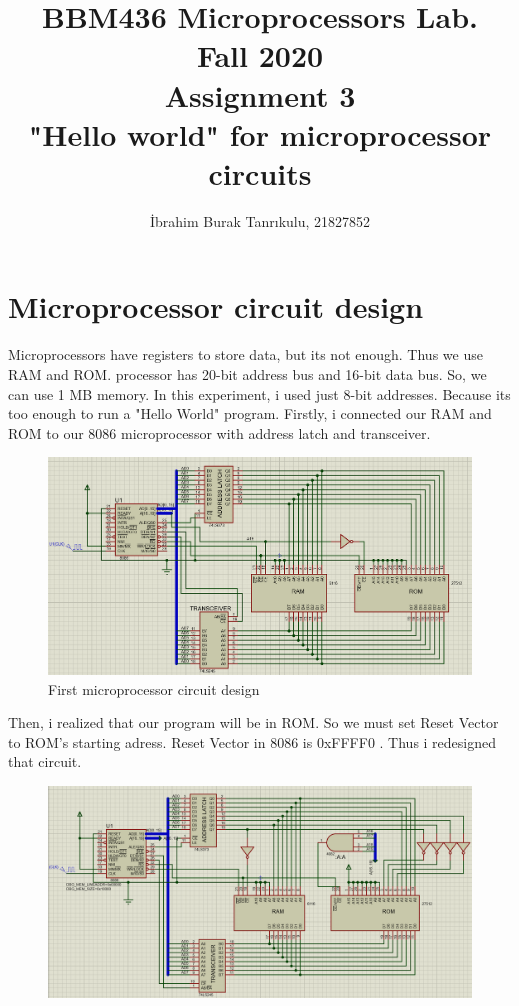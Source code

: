 \documentclass[11pt]{article}
\begin{document}
\author{İbrahim Burak Tanrıkulu, 21827852}
\title{BBM436 Microprocessors Lab.\\Fall 2020\\Assignment 3\\"Hello world" for microprocessor circuits}
\maketitle

\section{Microprocessor circuit design}
Microprocessors have registers to store data, but its not enough. Thus we use RAM and ROM.
 processor has 20-bit address bus and 16-bit data bus. So, we can use 1 MB memory.
\newline In this experiment, i used just 8-bit addresses. Because its too enough to run a "Hello World" program.
\newline Firstly, i connected our RAM and ROM to our 8086 microprocessor with address latch and transceiver.
\begin{figure}[h!]
	\centering
	\includegraphics[width=15cm]{Tasarım.png}
	\caption{First microprocessor circuit design}
	\label{fig:Tasarım1}
\end{figure}
\newline
Then, i realized that our program will be in ROM. So we must set Reset Vector to ROM's starting adress. Reset Vector in 8086 is 0xFFFF0 . Thus i redesigned that circuit.
\begin{figure}[h!]
	\centering
	\includegraphics[width=14cm]{Tasarım2.png}
	\label{fig:Tasarım2}
\end{figure}
\end{document}
